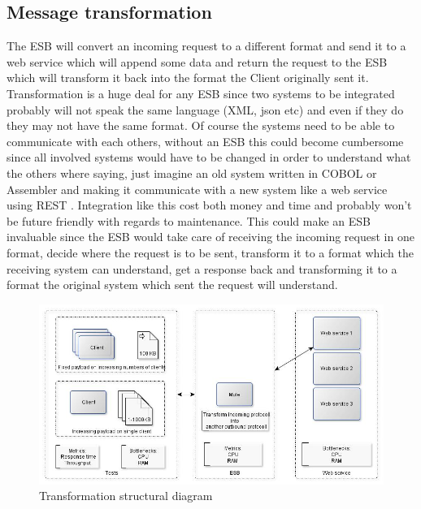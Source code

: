 \subsection{Message transformation}
The ESB will convert an incoming request to a different format and send it to a web service which will append some data and return the request to the ESB which will transform it back into the format the Client originally sent it.
Transformation is a huge deal for any ESB since two systems to be integrated probably will not speak the same language (XML, json etc) and even if they do they may not have the same format. Of course the systems need to be able to communicate with each others, without an ESB this could become cumbersome since all involved systems would have to be changed in order to understand what the others where saying, just imagine an old system written in COBOL or Assembler and making it communicate with a new system like a web service using REST \cite{whatisrest}. Integration like this cost both money and time and probably won't be future friendly with regards to maintenance.
This could make an ESB invaluable since the ESB would take care of receiving the incoming request in one format, decide where the request is to be sent, transform it to a format which the receiving system can understand, get a response back and transforming it to a format the original system which sent the request will understand.

\begin{figure}[H]
	\centerline{\includegraphics[scale=0.43]{img/transformation}}
	\caption{Transformation structural diagram}
\end{figure}


